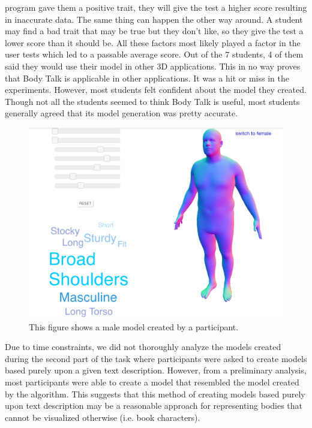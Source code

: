\documentclass[journal]{vgtc}                %
\begin{document}
program gave them
a positive trait, they will give the test a higher score resulting in inaccurate data. The same thing can happen the other way around. A
student may find
a bad trait that may be true but they don't like, so they give the test a lower score than it should be. All these factors most likely
played a factor in
the user tests which led to a passable average score. Out of the 7 students, 4 of them said they would use their model in other 3D
applications. This in no way proves that Body Talk is applicable in other applications. It was a hit or miss in the experiments.
However, most students felt confident about the model they created. Though not all the students seemed to think Body Talk is useful,
most students generally agreed that its model generation was pretty accurate. \newline

\begin{figure}[!htb]
	\includegraphics[width=\columnwidth]{male_user.png}
	\caption{This figure shows a male model created by a participant.}
\end{figure}

Due to time constraints, we did not thoroughly analyze the models created during the second part of the task where participants
were asked to create models based purely upon a given text description. However, from a preliminary analysis, most participants were
able to create a model that resembled the model created by the algorithm. This suggests that this method of creating models based purely
upon text description may be a reasonable approach for representing bodies that cannot be visualized otherwise (i.e. book characters).
\end{document}
